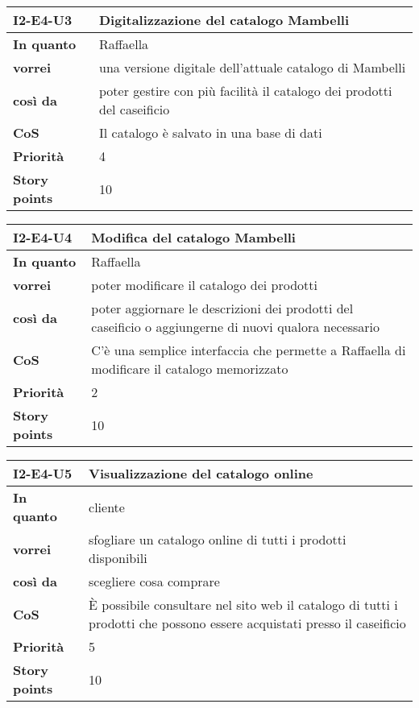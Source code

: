 \begin{table}[H]
  \begin{tabularx}{\textwidth}{lX}
    \toprule
    \textbf{I2-E4-U3} & \textbf{Digitalizzazione del catalogo Mambelli} \\
    \midrule
    \textbf{In quanto} & Raffaella \\
    \textbf{vorrei} & una versione digitale dell'attuale catalogo di Mambelli \\
    \textbf{così da} & poter gestire con più facilità il catalogo dei prodotti del caseificio \\
    \midrule
    \textbf{CoS} & Il catalogo è salvato in una base di dati \\
    \midrule
    \textbf{Priorità} & 4 \\
    \textbf{Story points} & 10 \\
    \bottomrule
  \end{tabularx}
  \label{user-story:i2-e4-u3}
\end{table}

\begin{table}[H]
  \begin{tabularx}{\textwidth}{lX}
    \toprule
    \textbf{I2-E4-U4} & \textbf{Modifica del catalogo Mambelli} \\
    \midrule
    \textbf{In quanto} & Raffaella \\
    \textbf{vorrei} & poter modificare il catalogo dei prodotti \\
    \textbf{così da} & poter aggiornare le descrizioni dei prodotti del caseificio o aggiungerne di nuovi qualora necessario \\
    \midrule
    \textbf{CoS} & C'è una semplice interfaccia che permette a Raffaella di modificare il catalogo memorizzato \\
    \midrule
    \textbf{Priorità} & 2 \\
    \textbf{Story points} & 10 \\
    \bottomrule
  \end{tabularx}
  \label{user-story:i2-e4-u4}
\end{table}

\begin{table}[H]
  \begin{tabularx}{\textwidth}{lX}
    \toprule
    \textbf{I2-E4-U5} & \textbf{Visualizzazione del catalogo online} \\
    \midrule
    \textbf{In quanto} & cliente \\
    \textbf{vorrei} & sfogliare un catalogo online di tutti i prodotti disponibili \\
    \textbf{così da} & scegliere cosa comprare \\
    \midrule
    \textbf{CoS} & È possibile consultare nel sito web il catalogo di tutti i prodotti che possono essere acquistati presso il caseificio \\
    \midrule
    \textbf{Priorità} & 5 \\
    \textbf{Story points} & 10 \\
    \bottomrule
  \end{tabularx}
  \label{user-story:i2-e4-u5}
\end{table}


